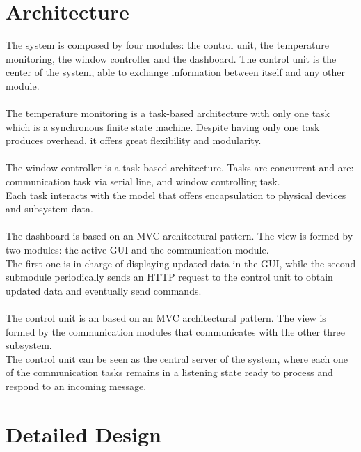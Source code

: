 \documentclass[a4paper,12pt]{report}
\begin{document}
        \section{Architecture}
    
            The system is composed by four modules: the control unit, the temperature monitoring, the window controller and the dashboard. 
            The control unit is the center of the system, able to exchange information between itself and any other module.\\\\
            The temperature monitoring is a task-based architecture with only one task which is a synchronous finite state machine. 
            Despite having only one task produces overhead, it offers great flexibility and modularity.\\\\
            The window controller is a task-based architecture. Tasks are concurrent and are: communication task via serial line, and window 
            controlling task.\\
            Each task interacts with the model that offers encapsulation to physical devices and subsystem data.\\\\
            The dashboard is based on an MVC architectural pattern. The view is formed by two modules: the active GUI and the communication 
            module. \\
            The first one is in charge of displaying updated data in the GUI, while the second submodule periodically sends an HTTP request 
            to the control unit to obtain updated data and eventually send commands.\\\\
            The control unit is an based on an MVC architectural pattern. The view is formed by the communication modules that communicates 
            with the other three subsystem.\\
            The control unit can be seen as the central server of the system, where each one of the communication tasks remains in a 
            listening state ready to process and respond to an incoming message.
    
        \section{Detailed Design}
    
\end{document}

